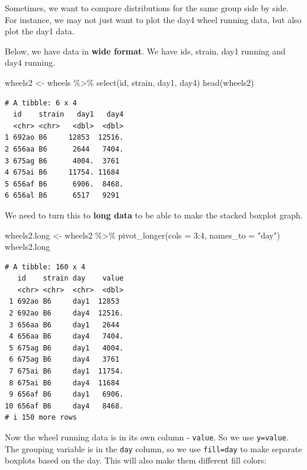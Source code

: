 \documentclass[
  letterpaper,
  DIV=11,
  numbers=noendperiod]{scrreprt}
\newenvironment{Shaded}{\begin{snugshade}}{\end{snugshade}}
\newcommand{\AttributeTok}[1]{\textcolor[rgb]{0.40,0.45,0.13}{#1}}
\newcommand{\DecValTok}[1]{\textcolor[rgb]{0.68,0.00,0.00}{#1}}
\newcommand{\FunctionTok}[1]{\textcolor[rgb]{0.28,0.35,0.67}{#1}}
\newcommand{\NormalTok}[1]{\textcolor[rgb]{0.00,0.23,0.31}{#1}}
\newcommand{\OtherTok}[1]{\textcolor[rgb]{0.00,0.23,0.31}{#1}}
\newcommand{\SpecialCharTok}[1]{\textcolor[rgb]{0.37,0.37,0.37}{#1}}
\newcommand{\StringTok}[1]{\textcolor[rgb]{0.13,0.47,0.30}{#1}}
\begin{document}
Sometimes, we want to compare distributions for the same group side by
side. For instance, we may not just want to plot the day4 wheel running
data, but also plot the day1 data.

Below, we have data in \textbf{wide format}. We have ids, strain, day1
running and day4 running.

\begin{Shaded}
\begin{Highlighting}[]
\NormalTok{wheels2 }\OtherTok{\textless{}{-}}\NormalTok{ wheels }\SpecialCharTok{\%\textgreater{}\%} \FunctionTok{select}\NormalTok{(id, strain, day1, day4)}
\FunctionTok{head}\NormalTok{(wheels2)}
\end{Highlighting}
\end{Shaded}

\begin{verbatim}
# A tibble: 6 x 4
  id    strain   day1   day4
  <chr> <chr>   <dbl>  <dbl>
1 692ao B6     12853  12516.
2 656aa B6      2644   7404.
3 675ag B6      4004.  3761 
4 675ai B6     11754. 11684 
5 656af B6      6906.  8468.
6 656al B6      6517   9291 
\end{verbatim}

We need to turn this to \textbf{long data} to be able to make the
stacked boxplot graph.

\begin{Shaded}
\begin{Highlighting}[]
\NormalTok{wheels2.long }\OtherTok{\textless{}{-}}\NormalTok{ wheels2 }\SpecialCharTok{\%\textgreater{}\%} \FunctionTok{pivot\_longer}\NormalTok{(}\AttributeTok{cols =} \DecValTok{3}\SpecialCharTok{:}\DecValTok{4}\NormalTok{, }\AttributeTok{names\_to =} \StringTok{"day"}\NormalTok{)}
\NormalTok{wheels2.long}
\end{Highlighting}
\end{Shaded}

\begin{verbatim}
# A tibble: 160 x 4
   id    strain day    value
   <chr> <chr>  <chr>  <dbl>
 1 692ao B6     day1  12853 
 2 692ao B6     day4  12516.
 3 656aa B6     day1   2644 
 4 656aa B6     day4   7404.
 5 675ag B6     day1   4004.
 6 675ag B6     day4   3761 
 7 675ai B6     day1  11754.
 8 675ai B6     day4  11684 
 9 656af B6     day1   6906.
10 656af B6     day4   8468.
# i 150 more rows
\end{verbatim}

Now the wheel running data is in its own column - \texttt{value}. So we
use \texttt{y=value}. The grouping variable is in the \texttt{day}
column, so we use \texttt{fill=day} to make separate boxplots based on
the day. This will also make them different fill colors:
\end{document}
